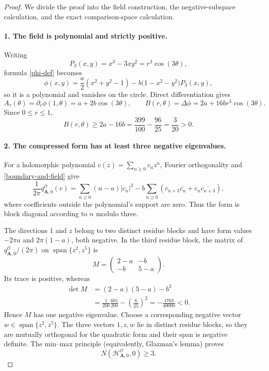 \documentclass[11pt]{article}
\newcommand{\HH}{\mathscr H}
\newcommand{\Span}{\operatorname{span}}
\begin{document}
\begin{proof}
We divide the proof into the field construction, the negative-subspace
calculation, and the exact comparison-space calculation.

\paragraph{1. The field is polynomial and strictly positive.}
Writing
\[
 P_3(x,y)=x^3-3xy^2=r^3\cos(3\theta),
\]
formula \eqref{phi-def} becomes
\[
 \phi(x,y)=\frac a2(x^2+y^2-1)
 -b\bigl(1-x^2-y^2\bigr)P_3(x,y),
\]
so it is a polynomial and vanishes on the circle.  Direct differentiation
gives
\begin{equation}\label{boundary-and-field}
 A_\tau(\theta)=\partial_r\phi(1,\theta)
 =a+2b\cos(3\theta),
 \qquad
 B(r,\theta)=\Delta\phi=2a+16br^3\cos(3\theta).
\end{equation}
Since $0\leq r\leq1$,
\[
 B(r,\theta)\geq2a-16b
 =\frac{399}{100}-\frac{96}{25}=\frac3{20}>0.
\]

\paragraph{2. The compressed form has at least three negative eigenvalues.}
For a holomorphic polynomial $v(z)=\sum_{n\geq0}c_nz^n$, Fourier
orthogonality and \eqref{boundary-and-field} give
\begin{equation}\label{fourier-form}
 \frac1{2\pi}q^{\mathcal O}_{\mathbf A,0}(v)
 =\sum_{n\geq0}(n-a)|c_n|^2
 -b\sum_{n\geq0}
 \left(c_{n+3}\overline{c_n}+c_n\overline{c_{n+3}}\right),
\end{equation}
where coefficients outside the polynomial's support are zero.  Thus the form
is block diagonal according to $n$ modulo three.

The directions $1$ and $z$ belong to two distinct residue blocks and have
form values $-2\pi a$ and $2\pi(1-a)$, both negative.  In the third residue
block, the matrix of $q^{\mathcal O}_{\mathbf A,0}/(2\pi)$ on
$\Span\{z^2,z^5\}$ is
\[
 M=\begin{pmatrix}2-a&-b\\-b&5-a\end{pmatrix}.
\]
Its trace is positive, whereas
\begin{align*}
 \det M
 &=(2-a)(5-a)-b^2\\
 &=\frac1{200}\frac{601}{200}-\left(\frac6{25}\right)^2
 =-\frac{1703}{40000}<0.
\end{align*}
Hence $M$ has one negative eigenvalue.  Choose a corresponding negative
vector $w\in\Span\{z^2,z^5\}$.  The three vectors $1,z,w$ lie in distinct
residue blocks, so they are mutually orthogonal for the quadratic form and
their span is negative definite.  The min--max principle (equivalently,
Glazman's lemma) proves
\[
 N(\HH^{\mathcal O}_{\mathbf A,0},0)\geq3.
\]


\end{proof}
\end{document}

